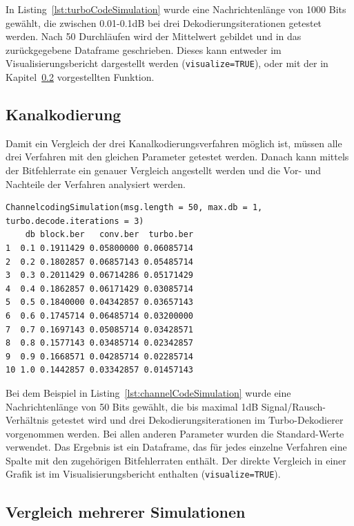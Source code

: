 In Listing~\ref{lst:turboCodeSimulation} wurde eine Nachrichtenlänge von 1000 Bits gewählt, die zwischen 0.01-0.1dB bei drei Dekodierungsiterationen getestet werden. Nach 50 Durchläufen wird der Mittelwert gebildet und in das zurückgegebene Dataframe geschrieben. Dieses kann entweder im Visualisierungsbericht dargestellt werden (\texttt{visualize=TRUE}), oder mit der in Kapitel~\ref{sec:example_simulations_plot} vorgestellten Funktion.

\FloatBarrier
\subsection{Kanalkodierung}
\label{sec:example_simulations_channel}

Damit ein Vergleich der drei Kanalkodierungsverfahren möglich ist, müssen alle drei Verfahren mit den gleichen Parameter getestet werden. Danach kann mittels der Bitfehlerrate ein genauer Vergleich angestellt werden und die Vor- und Nachteile der Verfahren analysiert werden.

\begin{lstlisting}[caption=Kanalkodierungs-Simulation, label={lst:channelCodeSimulation}, float=!th]
ChannelcodingSimulation(msg.length = 50, max.db = 1, turbo.decode.iterations = 3)
    db block.ber   conv.ber  turbo.ber
1  0.1 0.1911429 0.05800000 0.06085714
2  0.2 0.1802857 0.06857143 0.05485714
3  0.3 0.2011429 0.06714286 0.05171429
4  0.4 0.1862857 0.06171429 0.03085714
5  0.5 0.1840000 0.04342857 0.03657143
6  0.6 0.1745714 0.06485714 0.03200000
7  0.7 0.1697143 0.05085714 0.03428571
8  0.8 0.1577143 0.03485714 0.02342857
9  0.9 0.1668571 0.04285714 0.02285714
10 1.0 0.1442857 0.03342857 0.01457143
\end{lstlisting}

Bei dem Beispiel in Listing~\ref{lst:channelCodeSimulation} wurde eine Nachrichtenlänge von 50 Bits gewählt, die bis maximal 1dB Signal/Rausch-Verhältnis getestet wird und drei Dekodierungsiterationen im Turbo-Dekodierer vorgenommen werden. Bei allen anderen Parameter wurden die Standard-Werte verwendet. Das Ergebnis ist ein Dataframe, das für jedes einzelne Verfahren eine Spalte mit den zugehörigen Bitfehlerraten enthält. Der direkte Vergleich in einer Grafik ist im Visualisierungsbericht enthalten (\texttt{visualize=TRUE}). 

\FloatBarrier
\subsection{Vergleich mehrerer Simulationen}
\label{sec:example_simulations_plot}

